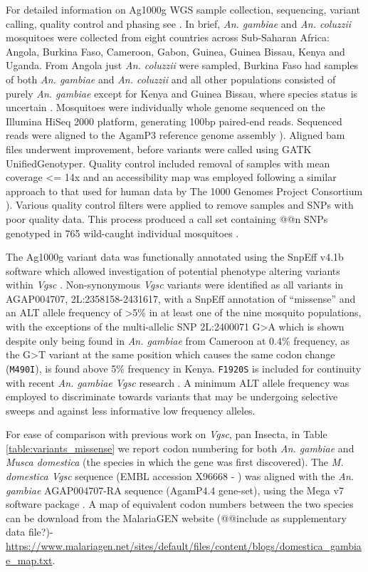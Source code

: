 \documentclass[a4paper,11pt,abstracton,hidelinks]{scrartcl}
\begin{document}
%
For detailed information on Ag1000g WGS sample collection, sequencing, variant calling, quality control and phasing see \cite{Ag1000gConsortium2017}.
%
In brief, \emph{An. gambiae} and \emph{An. coluzzii} mosquitoes were collected from eight countries across Sub-Saharan Africa: Angola, Burkina Faso, Cameroon, Gabon, Guinea, Guinea Bissau, Kenya and Uganda. 
%
From Angola just \emph{An. coluzzii} were sampled, Burkina Faso had samples of both \emph{An. gambiae} and \emph{An. coluzzii} and all other populations consisted of purely \emph{An. gambiae} except for Kenya and Guinea Bissau, where species status is uncertain \cite{Ag1000gConsortium2017}.
%
Mosquitoes were individually whole genome sequenced on the Illumina HiSeq 2000 platform, generating 100bp paired-end reads. 
%
Sequenced reads were aligned to the \cite{An. gambiae} AgamP3 reference genome assembly \cite{Holt2002}). 
%
Aligned bam files underwent improvement, before variants were called using GATK UnifiedGenotyper. 
%
Quality control included removal of samples with mean coverage <= 14x and an accessibility map was employed following a similar approach to that used for human data by The 1000 Genomes Project Consortium \cite{The1000GenomesProjectConsortium2010}). 
%
Various quality control filters were applied to remove samples and SNPs with poor quality data. 
%
This process produced a call set containing @@n SNPs genotyped in 765 wild-caught individual mosquitoes \cite{Ag1000gConsortium2017}.

%
The Ag1000g variant data was functionally annotated using the SnpEff v4.1b software which allowed investigation of potential phenotype altering variants within \emph{Vgsc} \cite{Cingolani2012}.
%
Non-synonymous \emph{Vgsc} variants were identified as all variants in AGAP004707, 2L:2358158-2431617, with a SnpEff annotation of “missense”  and an ALT allele frequency of >5\% in at least one of the nine mosquito populations, with the exceptions of the multi-allelic SNP 2L:2400071 G>A which is shown despite only being found in \emph{An. gambiae} from Cameroon at 0.4\% frequency, as the G>T variant at the same position which causes the same codon change (\texttt{M490I}), is found above 5\% frequency in Kenya.
%
\texttt{F1920S} is included for continuity with recent \emph{An. gambiae Vgsc} research \cite{Ag1000gConsortium2017}.
%
A minimum ALT allele frequency was employed to discriminate towards variants that may be undergoing selective sweeps and against less informative low frequency alleles.

%
For ease of comparison with previous work on \emph{Vgsc}, pan Insecta, in Table \ref{table:variants_missense} we report codon numbering for both \emph{An. gambiae} and \emph{Musca domestica} (the species in which the gene was first discovered).
%
The \emph{M. domestica Vgsc} sequence (EMBL accession X96668 - \cite{Williamson1996}) was aligned with the \emph{An. gambiae} AGAP004707-RA sequence (AgamP4.4 gene-set), using the Mega v7 software package \cite{Kumar2016}.
%
A map of equivalent codon numbers between the two species can be download from the MalariaGEN website (@@include as supplementary data file?)- 
\url{https://www.malariagen.net/sites/default/files/content/blogs/domestica_gambiae_map.txt}.
\end{document}
